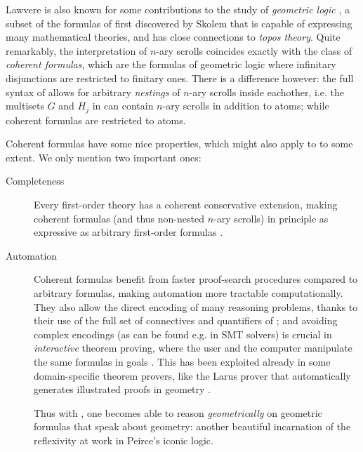 Lawvere is also known for some contributions to the study of \emph{geometric
logic} , a subset of the formulas of  first
discovered by Skolem  that is capable of expressing
many mathematical theories, and has close connections to \emph{topos theory}.
Quite remarkably, the interpretation of $n$-ary scrolls coincides exactly with
the class of \emph{coherent formulas}, which are the formulas of geometric logic
where infinitary disjunctions are restricted to finitary ones. There is a
difference however: the full syntax of  allows for arbitrary \emph{nestings}
of $n$-ary scrolls inside eachother, i.e. the multisets $G$ and $H_j$ in
 can contain $n$-ary scrolls in addition to atoms; while
coherent formulas are restricted to atoms.

Coherent formulas have some nice properties, which might also apply to  to
some extent. We only mention two important ones:
\begin{description}
  \item[Completeness] Every first-order theory has a coherent conservative
  extension, making coherent formulas (and thus non-nested $n$-ary scrolls) in
  principle as expressive as arbitrary first-order formulas
  .
  
  \item[Automation] Coherent formulas benefit from faster proof-search
  procedures compared to arbitrary formulas, making automation more tractable
  computationally. They also allow the direct encoding of many reasoning
  problems, thanks to their use of the full set of connectives and quantifiers
  of ; and avoiding complex encodings (as can be found e.g. in SMT solvers)
  is crucial in \emph{interactive} theorem proving, where the user and the
  computer manipulate the same formulas in goals
  . This has been exploited already in some
  domain-specific theorem provers, like the Larus prover that automatically
  generates illustrated proofs in geometry
  .
  
  \begin{remark}
  Thus with , one becomes able to reason \emph{geometrically} on geometric
  formulas that speak about geometry: another beautiful incarnation of the
  reflexivity at work in Peirce's iconic logic.
  \end{remark}
\end{description}


